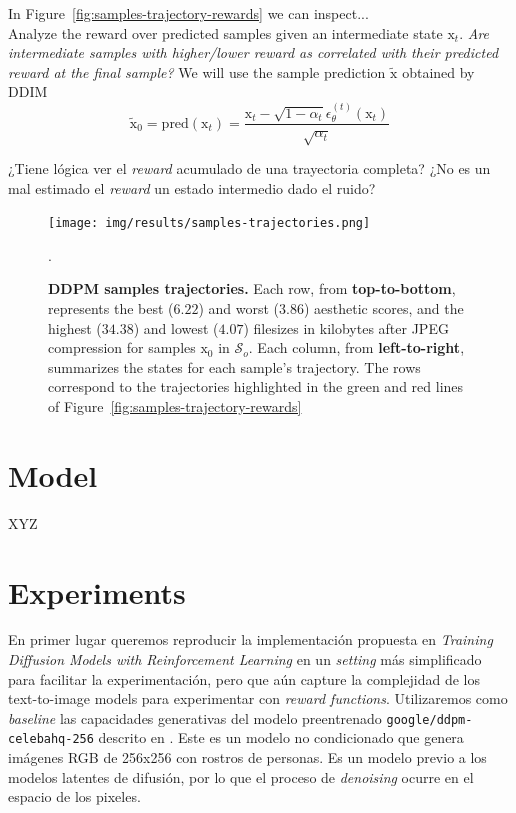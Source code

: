 In Figure~\ref{fig:samples-trajectory-rewards} we can inspect...\\

Analyze the reward over predicted samples given an intermediate
state $\mathrm{x}_{t}$. \textit{Are intermediate samples with higher/lower reward as correlated with their predicted reward at the final sample?} We
will use the sample prediction $\tilde{\mathrm{x}}$ obtained by DDIM
\begin{equation}\label{ddim-predicted-sample}
  \tilde{\mathrm{x}}_{0}=\text{pred}(\mathrm{x}_{t})=\frac{\mathrm{x}_{t}-\sqrt{1-\alpha_{t}}\epsilon_{\theta}^{(t)}(\mathrm{x}_{t})}{\sqrt{\alpha_{t}}}
\end{equation}

¿Tiene lógica ver el \textit{reward} acumulado de una trayectoria completa?
¿No es un mal estimado el \textit{reward} un estado intermedio dado el ruido?

\begin{figure}[ht]
  \centering
  \texttt{[image: img/results/samples-trajectories.png]}
  \vspace{-18pt}  %
    \captionsetup{width=\textwidth} %
    \caption{\textbf{DDPM samples trajectories.} Each row, from \textbf{top-to-bottom}, represents the best ($6.22$)
  and worst ($3.86$) aesthetic scores, and the highest ($34.38$) and lowest 
  ($4.07$) filesizes in kilobytes after JPEG compression for samples
  $\mathrm{x}_{0}$ in $\mathcal{S}_{o}$. Each column, from \textbf{left-to-right}, summarizes the
  states for each sample's trajectory. The rows correspond to the trajectories
  highlighted in the green and red lines of Figure~\ref{fig:samples-trajectory-rewards}}.
    \label{fig:sample-trajectories}
\end{figure}

\section{Model}

XYZ

\section{Experiments}

En primer lugar queremos reproducir la implementación propuesta en \textit{Training Diffusion Models with Reinforcement Learning} \cite{black2023training} en un \textit{setting} más simplificado para facilitar
la experimentación, pero que aún capture la complejidad de los text-to-image models para experimentar con \textit{reward functions}. Utilizaremos como \textit{baseline} las capacidades generativas del modelo preentrenado \texttt{google/ddpm-celebahq-256} descrito en \cite{ho2020denoising}. Este es un modelo no condicionado que genera imágenes RGB de 256x256 con rostros de personas. Es un modelo previo a los modelos latentes de difusión, por lo que el proceso de \textit{denoising} ocurre en el espacio de los pixeles. \\


